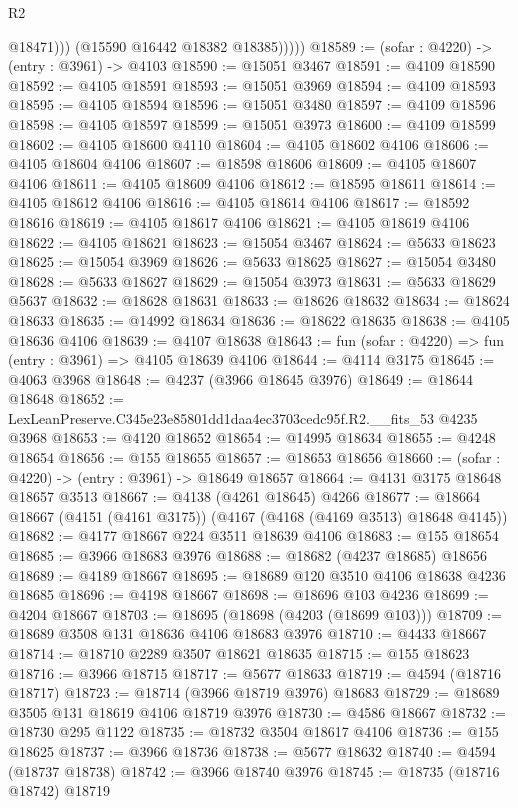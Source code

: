 \begin{lexlean}{R2}
\begin{coremodule}
                  @18471)))
            (@15590 @16442 @18382 @18385)))))
@18589 := (sofar : @4220) -> (entry : @3961) -> @4103
@18590 := @15051 @3467
@18591 := @4109 @18590
@18592 := @4105 @18591
@18593 := @15051 @3969
@18594 := @4109 @18593
@18595 := @4105 @18594
@18596 := @15051 @3480
@18597 := @4109 @18596
@18598 := @4105 @18597
@18599 := @15051 @3973
@18600 := @4109 @18599
@18602 := @4105 @18600 @4110
@18604 := @4105 @18602 @4106
@18606 := @4105 @18604 @4106
@18607 := @18598 @18606
@18609 := @4105 @18607 @4106
@18611 := @4105 @18609 @4106
@18612 := @18595 @18611
@18614 := @4105 @18612 @4106
@18616 := @4105 @18614 @4106
@18617 := @18592 @18616
@18619 := @4105 @18617 @4106
@18621 := @4105 @18619 @4106
@18622 := @4105 @18621
@18623 := @15054 @3467
@18624 := @5633 @18623
@18625 := @15054 @3969
@18626 := @5633 @18625
@18627 := @15054 @3480
@18628 := @5633 @18627
@18629 := @15054 @3973
@18631 := @5633 @18629 @5637
@18632 := @18628 @18631
@18633 := @18626 @18632
@18634 := @18624 @18633
@18635 := @14992 @18634
@18636 := @18622 @18635
@18638 := @4105 @18636 @4106
@18639 := @4107 @18638
@18643 := fun (sofar : @4220) => fun (entry : @3961) => @4105 @18639 @4106
@18644 := @4114 @3175
@18645 := @4063 @3968
@18648 := @4237 (@3966 @18645 @3976)
@18649 := @18644 @18648
@18652 := LexLeanPreserve.C345e23e85801dd1daa4ec3703cedc95f.R2.__fits_53 @4235 @3968
@18653 := @4120 @18652
@18654 := @14995 @18634
@18655 := @4248 @18654
@18656 := @155 @18655
@18657 := @18653 @18656
@18660 := (sofar : @4220) -> (entry : @3961) -> @18649 @18657
@18664 := @4131 @3175 @18648 @18657 @3513
@18667 := @4138 (@4261 @18645) @4266
@18677 := @18664 @18667 (@4151 (@4161 @3175)) (@4167 (@4168 (@4169 @3513) @18648 @4145))
@18682 := @4177 @18667 @224 @3511 @18639 @4106
@18683 := @155 @18654
@18685 := @3966 @18683 @3976
@18688 := @18682 (@4237 @18685) @18656
@18689 := @4189 @18667
@18695 := @18689 @120 @3510 @4106 @18638 @4236 @18685
@18696 := @4198 @18667
@18698 := @18696 @103 @4236
@18699 := @4204 @18667
@18703 := @18695 (@18698 (@4203 (@18699 @103)))
@18709 := @18689 @3508 @131 @18636 @4106 @18683 @3976
@18710 := @4433 @18667
@18714 := @18710 @2289 @3507 @18621 @18635
@18715 := @155 @18623
@18716 := @3966 @18715
@18717 := @5677 @18633
@18719 := @4594 (@18716 @18717)
@18723 := @18714 (@3966 @18719 @3976) @18683
@18729 := @18689 @3505 @131 @18619 @4106 @18719 @3976
@18730 := @4586 @18667
@18732 := @18730 @295 @1122
@18735 := @18732 @3504 @18617 @4106
@18736 := @155 @18625
@18737 := @3966 @18736
@18738 := @5677 @18632
@18740 := @4594 (@18737 @18738)
@18742 := @3966 @18740 @3976
@18745 := @18735 (@18716 @18742) @18719

\end{coremodule}
\end{lexlean}
